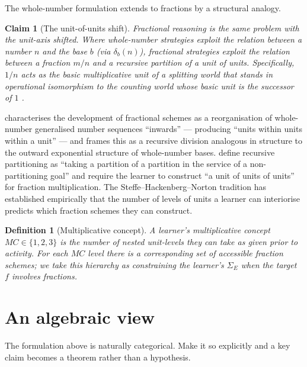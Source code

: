 \documentclass[11pt]{article}
\newtheorem{definition}{Definition}
\newtheorem{claim}{Claim}
\begin{document}
The whole-number formulation extends to fractions by a structural
analogy.

\begin{claim}[The unit-of-units shift]
Fractional reasoning is the same problem with the unit-axis shifted.
Where whole-number strategies exploit the relation between a number
$n$ and the base $b$ (via $\delta_b(n)$), fractional strategies
exploit the relation between a fraction $m/n$ and a recursive
partition of a unit of units. Specifically, $1/n$ acts as the basic
multiplicative unit of a \emph{splitting world} that stands in
operational isomorphism to the \emph{counting world} whose basic unit
is the successor of $1$ \parencite{confreySmith1995}.
\end{claim}

\textcite{olive1999} characterises the development of fractional
schemes as a reorganisation of whole-number generalised number
sequences ``inwards'' — producing ``units within units within a
unit'' — and frames this as a recursive division analogous in
structure to the outward exponential structure of whole-number bases.
\textcite{izsak2008} define recursive partitioning as ``taking a
partition of a partition in the service of a non-partitioning goal''
and require the learner to construct ``a unit of units of units'' for
fraction multiplication. The Steffe--Hackenberg--Norton tradition
\parencite{steffeOlive2010, hackenberg2007, norton2012splitting} has
established empirically that the number of levels of units a learner
can interiorise predicts which fraction schemes they can construct.

\begin{definition}[Multiplicative concept]
A learner's \emph{multiplicative concept} $MC \in \{1, 2, 3\}$ is the
number of nested unit-levels they can take as given prior to activity.
For each $MC$ level there is a corresponding set of accessible
fraction schemes; we take this hierarchy as constraining the learner's
$\Sigma_E$ when the target $f$ involves fractions.
\end{definition}

\section{An algebraic view}
\label{sec:algebra}

The formulation above is naturally categorical. Make it so explicitly
and a key claim becomes a theorem rather than a hypothesis.
\end{document}
